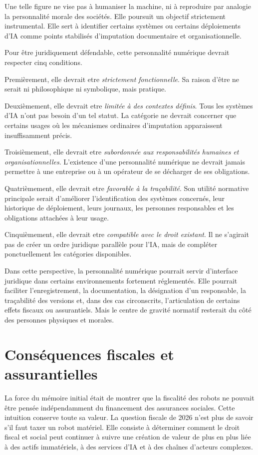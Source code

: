 \documentclass[11pt]{article}
\begin{document}
Une telle figure ne vise pas à humaniser la machine, ni à reproduire par analogie la personnalité morale des sociétés. Elle poursuit un objectif strictement instrumental. Elle sert à identifier certains systèmes ou certains déploiements d'IA comme points stabilisés d'imputation documentaire et organisationnelle.

Pour être juridiquement défendable, cette personnalité numérique devrait respecter cinq conditions.

Premièrement, elle devrait etre \emph{strictement fonctionnelle}. Sa raison d'être ne serait ni philosophique ni symbolique, mais pratique.

Deuxièmement, elle devrait etre \emph{limitée à des contextes définis}. Tous les systèmes d'IA n'ont pas besoin d'un tel statut. La catégorie ne devrait concerner que certains usages où les mécanismes ordinaires d'imputation apparaissent insuffisamment précis.

Troisièmement, elle devrait etre \emph{subordonnée aux responsabilités humaines et organisationnelles}. L'existence d'une personnalité numérique ne devrait jamais permettre à une entreprise ou à un opérateur de se décharger de ses obligations.

Quatrièmement, elle devrait etre \emph{favorable à la traçabilité}. Son utilité normative principale serait d'améliorer l'identification des systèmes concernés, leur historique de déploiement, leurs journaux, les personnes responsables et les obligations attachées à leur usage.

Cinquièmement, elle devrait etre \emph{compatible avec le droit existant}. Il ne s'agirait pas de créer un ordre juridique parallèle pour l'IA, mais de compléter ponctuellement les catégories disponibles.

Dans cette perspective, la personnalité numérique pourrait servir d'interface juridique dans certains environnements fortement réglementés. Elle pourrait faciliter l'enregistrement, la documentation, la désignation d'un responsable, la traçabilité des versions et, dans des cas circonscrits, l'articulation de certains effets fiscaux ou assurantiels. Mais le centre de gravité normatif resterait du côté des personnes physiques et morales.

\section{Conséquences fiscales et assurantielles}
La force du mémoire initial était de montrer que la fiscalité des robots ne pouvait être pensée indépendamment du financement des assurances sociales. Cette intuition conserve toute sa valeur. La question fiscale de 2026 n'est plus de savoir s'il faut taxer un robot matériel. Elle consiste à déterminer comment le droit fiscal et social peut continuer à suivre une création de valeur de plus en plus liée à des actifs immatériels, à des services d'IA et à des chaînes d'acteurs complexes.
\end{document}
